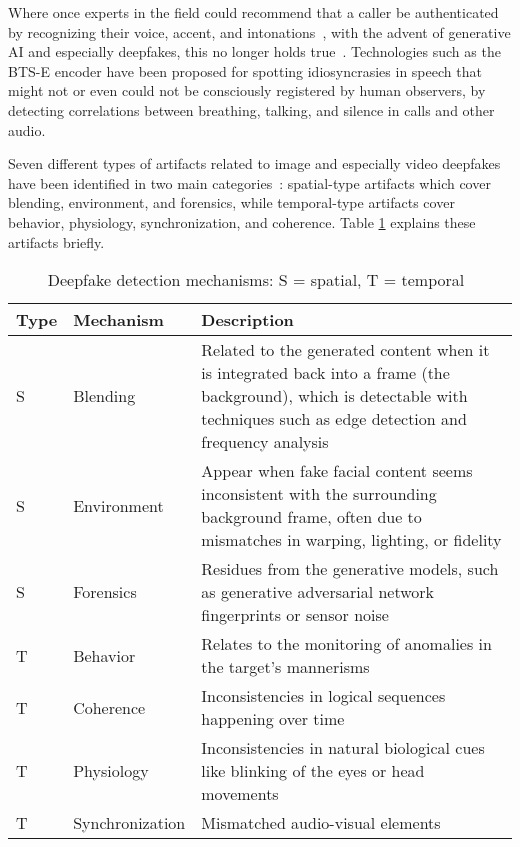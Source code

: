 Where once experts in the field could recommend that a caller be authenticated by recognizing their voice, accent, and intonations~\citep{mitnick_The_Art_of_Deception_2003}, with the advent of generative AI and especially deepfakes, this no longer holds true~\citep{doan_BTSE_Audio_Deepfake_Detection_2023}. Technologies such as the BTS-E encoder have been proposed for spotting idiosyncrasies in speech that might not or even could not be consciously registered by human observers, by detecting correlations between breathing, talking, and silence in calls and other audio.

%
%
Seven different types of artifacts related to image and especially video deepfakes have been identified in two main categories~\citep{mirsky_Creation_Detection_Deepfakes_2021}: spatial-type artifacts which cover blending, environment, and forensics, while temporal-type artifacts cover behavior, physiology, synchronization, and coherence. Table \ref{table:deepfake_artifacts} explains these artifacts briefly.

\begin{table}[h!]  

\renewcommand{\arraystretch}{1.5} %
\setlength{\tabcolsep}{5pt} %
\begin{tabularx}{\textwidth}{|l|l|X|} %
\hline  
\textbf{Type} & \textbf{Mechanism} & \textbf{Description} \\ \hline  
S & Blending & Related to the generated content when it is integrated back into a frame (the background), which is detectable with techniques such as edge detection and frequency analysis \\ \hline  
S & Environment & Appear when fake facial content seems inconsistent
with the surrounding background frame, often due to mismatches in warping, lighting, or
fidelity \\ \hline  
S & Forensics & Residues from the generative models, such as generative
adversarial network fingerprints or sensor noise \\ \hline  
T & Behavior & Relates to the monitoring of anomalies in the target’s mannerisms \\ \hline  
T & Coherence & Inconsistencies in logical sequences
happening over time\\ \hline  
T & Physiology & Inconsistencies in natural biological cues like blinking of
the eyes or head movements \\ \hline  
T & Synchronization & Mismatched
audio-visual elements \\ \hline  
\end{tabularx}  
\caption{Deepfake detection mechanisms: S = spatial, T = temporal~\citep{mirsky_Creation_Detection_Deepfakes_2021}}  
\label{table:deepfake_artifacts}  
\end{table}  




